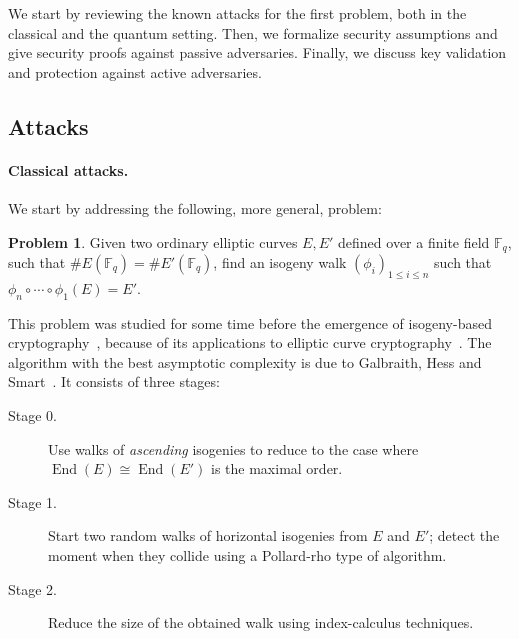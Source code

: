 \documentclass{article}
\newcommand{\F}{\mathbb{F}}
\theoremstyle{definition}
\newtheorem{prob}[theorem]{Problem}
\DeclareMathOperator{\End}{End}
\begin{document}
We start by reviewing the known attacks for the first problem, both in
the classical and the quantum setting. Then, we formalize security
assumptions and give security proofs against passive adversaries.
Finally, we discuss key validation and protection against active
adversaries.

\subsection{Attacks}
\label{sec:attacks}

\paragraph{Classical attacks.}
We start by addressing the following, more general, problem:

\begin{prob}
\label{prob:isog}
  Given two ordinary elliptic curves $E,E'$ defined over a finite
  field $\F_q$, such that $\#E(\F_q)=\#E'(\F_q)$, find an isogeny walk
  $(ϕ_i)_{1≤i≤n}$ such that $ϕ_n∘\cdots∘ϕ_1(E)=E'$.
\end{prob}

This problem was studied for some time before the emergence of
isogeny-based cryptography~\cite{Gal,GHS,galbraith+stolbunov11},
because of its applications to elliptic curve
cryptography~\cite{GHS,teske06,jao+miller+venkatesan09}.  The
algorithm with the best asymptotic complexity is due to Galbraith,
Hess and Smart~\cite{GHS}. It consists of three stages:
\begin{description}
\item[Stage 0.] Use walks of \emph{ascending} isogenies to reduce to the case where
  $\End(E)\cong\End(E')$ is the maximal order.
\item[Stage 1.] Start two random walks of horizontal isogenies 
  from $E$ and $E'$; detect the
  moment when they collide using a Pollard-rho type of algorithm.
\item[Stage 2.] Reduce the size of the obtained walk using
  index-calculus techniques.
\end{description}
\end{document}
